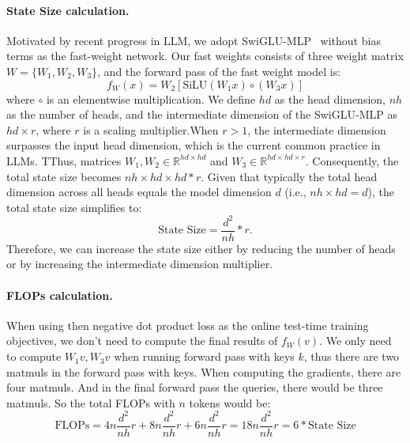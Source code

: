 \documentclass{article}
\begin{document}
\paragraph{State Size calculation.} Motivated by recent progress in LLM, we adopt SwiGLU-MLP~\cite{shazeer2020glu} without bias terms as the fast-weight 
network. 
Our fast weights consists of three weight matrix $W = \{W_1, W_2, W_3\}$, and the forward pass of the fast weight model is:
\begin{equation}
f_W(x) = W_2 \left[ \mathrm{SiLU}(W_1 x) \circ (W_3 x) \right]
\label{eq:swiglu_supp}
\end{equation}
where $\circ$ is an elementwise multiplication. We define $\mathit{hd}$ as the head dimension, $\mathit{nh}$ as the number of heads, and the intermediate dimension of the SwiGLU-MLP as $\mathit{hd} \times r$, where $r$ is a scaling multiplier.When $r > 1$, the intermediate dimension surpasses the input head dimension, which is the current common practice in LLMs.  TThus, matrices $W_1, W_2 \in \mathbb{R}^{\mathit{hd} \times \mathit{hd}}$ and $W_3 \in \mathbb{R}^{\mathit{hd} \times \mathit{hd} \times r}$. Consequently, the total state size becomes $\mathit{nh} \times \mathit{hd} \times \mathit{hd} *r$.  Given that typically the total head dimension across all heads equals the model dimension $d$ (i.e., $\mathit{nh} \times \mathit{hd} = d$), the total state size simplifies to:
\begin{equation}
    \text{State Size} = \frac{d^2}{\mathit{nh}} * r.
    \label{eq:state_size}
\end{equation}
Therefore, we can increase the state size either by reducing the number of heads or by increasing the intermediate dimension multiplier.

\paragraph{FLOPs calculation.} When using then negative dot product loss as the online test-time training objectives, we don't need to compute the final results of $f_W(v)$. We only need to compute $W_1v, W_3v$ when running forward pass with keys $k$, thus there are two matmuls in the forward pass with keys.  When computing the gradients, there are four matmuls. And in the final forward pass the queries, there would be three matmuls. So the total FLOPs with $n$ tokens would be:
\begin{equation}
    \text{FLOPs} = 4n \frac{d^2}{\mathit{nh}}r +  8n \frac{d^2}{\mathit{nh}}r +  6n \frac{d^2}{\mathit{nh}}r  = 18n \frac{d^2}{\mathit{nh}}r = 6 * \text{State Size} 
\end{equation}
\end{document}
